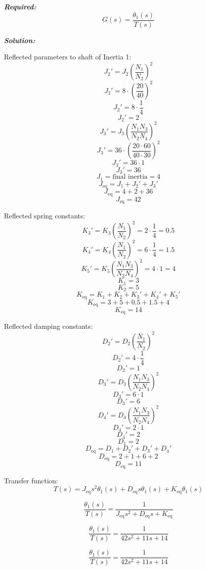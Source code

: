 ﻿\documentclass[11pt]{article}
\begin{document}
\vspace{12pt}

\noindent \textbf{\textit{Required:}}
\[
G(s) = \frac{\theta_1(s)}{T(s)}
\]

\vspace{12pt}


\noindent\textbf{\textit{Solution:}}

Reflected parameters to shaft of Inertia 1:
\[
J_2' = J_2 \left( \frac{N_1}{N_2} \right)^2 
\]
\[
J_2' = 8 \cdot \left( \frac{20}{40} \right)^2 
\]
\[
J_2' = 8 \cdot \frac{1}{4} 
\]
\[
J_2' = 2
\]
\[
J_3' = J_3 \left( \frac{N_1 N_3}{N_2 N_4} \right)^2 
\]
\[
J_3' = 36 \cdot \left( \frac{20 \cdot 60}{40 \cdot 30} \right)^2 
\]
\[
J_3' = 36 \cdot 1 
\]
\[
J_3' = 36
\]
\[
J_1 = \text{final inertia} = 4
\]
\[
J_{\text{eq}} = J_1 + J_2' + J_3' 
\]
\[
J_{\text{eq}} = 4 + 2 + 36 
\]
\[
J_{\text{eq}} = 42
\]

Reflected spring constants:
\[
K_3' = K_3 \left( \frac{N_1}{N_2} \right)^2 = 2 \cdot \frac{1}{4} = 0.5
\]
\[
K_4' = K_4 \left( \frac{N_1}{N_2} \right)^2 = 6 \cdot \frac{1}{4} = 1.5
\]
\[
K_5' = K_5 \left( \frac{N_1 N_3}{N_2 N_4} \right)^2 = 4 \cdot 1 = 4
\]
\[
K_1 = 3
\]
\[
K_2 = 5
\]
\[
K_{\text{eq}} = K_1 + K_2 + K_3' + K_4' + K_5' 
\]
\[
K_{\text{eq}} = 3 + 5 + 0.5 + 1.5 + 4 
\]
\[
K_{\text{eq}} = 14
\]

Reflected damping constants:
\[
D_2' = D_2 \left( \frac{N_1}{N_2} \right)^2 
\]
\[
D_2' = 4 \cdot \frac{1}{4} 
\]
\[
D_2' = 1
\]
\[
D_3' = D_3 \left( \frac{N_1 N_3}{N_2 N_4} \right)^2 
\]
\[
D_3' = 6 \cdot 1 
\]
\[
D_3' = 6
\]
\[
D_4' = D_4 \left( \frac{N_1 N_3}{N_2 N_4} \right)^2 
\]
\[
D_4' = 2 \cdot 1 
\]
\[
D_4' = 2
\]
\[
D_1 = 2
\]
\[
D_{\text{eq}} = D_1 + D_2' + D_3' + D_4' 
\]
\[
D_{\text{eq}} = 2 + 1 + 6 + 2 
\]
\[
D_{\text{eq}} = 11
\]

Transfer function:
\[
T(s) = J_{\text{eq}} s^2 \theta_1(s) + D_{\text{eq}} s \theta_1(s) + K_{\text{eq}} \theta_1(s)
\]

\[
\frac{\theta_1(s)}{T(s)} = \frac{1}{J_{\text{eq}} s^2 + D_{\text{eq}} s + K_{\text{eq}}}
\]

\[
\frac{\theta_1(s)}{T(s)} = \frac{1}{42 s^2 + 11 s + 14}
\]

\[
\boxed{\frac{\theta_1(s)}{T(s)} = \frac{1}{42 s^2 + 11 s + 14}}
\]


\end{document}

